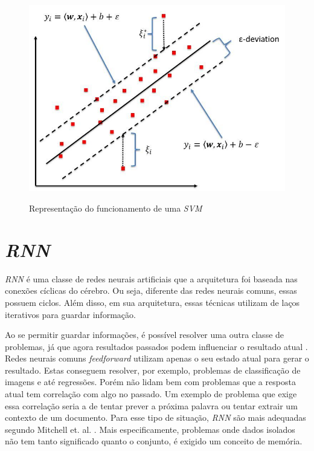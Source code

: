 



\begin{figure}[htbp]
    \centering
    \includegraphics[scale=1.0]{monography/img/models/svr_example.png}
    \label{figure:support_vector_machine}
    \caption[Representação do funcionamento de uma \textit{\acrshort{SVM}}]{Representação do funcionamento de uma \textit{\acrshort{SVM}}\footnotemark}
\end{figure}


\section{\textit{\acrfull{RNN}}}

\textit{\acrshort{RNN}} é uma classe de redes neurais artificiais que a arquitetura foi baseada nas conexões cíclicas do cérebro. Ou seja, diferente das redes neurais comuns, essas possuem ciclos. Além disso, em sua arquitetura, essas técnicas utilizam de laços iterativos para guardar informação. \cite{alex2012} 

Ao se permitir guardar informações, é possível resolver uma outra classe de problemas, já que agora resultados passados podem influenciar o resultado atual \cite{alex2012}. Redes neurais comuns \textit{feedforward} utilizam apenas o seu estado atual para gerar o resultado. Estas conseguem resolver, por exemplo, problemas de classificação de imagens e até regressões. Porém não lidam bem com problemas que a resposta atual tem correlação com algo no passado. Um exemplo de problema que exige essa correlação seria a de tentar prever a próxima palavra ou tentar extrair um contexto de um documento. Para esse tipo de situação, \textit{\acrshort{RNN}} são mais adequadas segundo Mitchell et. al. \cite{Mitchell_1997}. Mais especificamente, problemas onde dados isolados não tem tanto significado quanto o conjunto, é exigido um conceito de memória.

